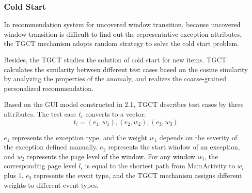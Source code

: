 \subsubsection{Cold Start}
In recommendation system for uncovered window transition, because uncovered window transition is difficult to find out the representative exception attributes, the TGCT mechanism adopts random strategy to solve the cold start problem. 


Besides, the TGCT studies the solution of cold start for new items. TGCT calculates the similarity between different test cases based on the cosine similarity by analyzing the properties of the anomaly, and realizes the coarse-grained personalized recommendation.

Based on the GUI model constructed in 2.1, TGCT describes test cases by three attributes. The test case $t_{i}$ converts to a vector:
\begin{equation}
t_{i} = {(e_{1}, w_{1}),(e_{2}, w_{2}),(e_{3}, w_{3})}
\end{equation}

$e_{1}$ represents the exception type, and the weight $w_{1}$ depends on the severity of the exception defined manually. $e_{2}$ represents the start window of an exception, and $w_{2}$ represents the page level of the window. For any window $w_{i}$, the corresponding page level $l_{i}$ is equal to the shortest path from MainActivity to $w_{i}$ plus 1.
$e_{3}$ represents the event type, and the TGCT mechanism assigns different weights to different event types.

